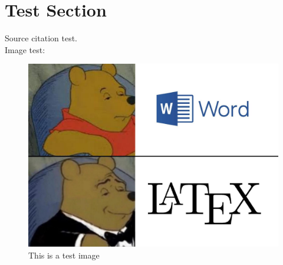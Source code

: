 \chapter{Test Section}

Source citation test.\cite{Madsen2010} \\

Image test:
\begin{figure}[H]
    \centering
    \includegraphics[scale=0.2]{figures/testimage.jpg}
    \caption{This is a test image}
    \label{fig:test_image}
\end{figure}


